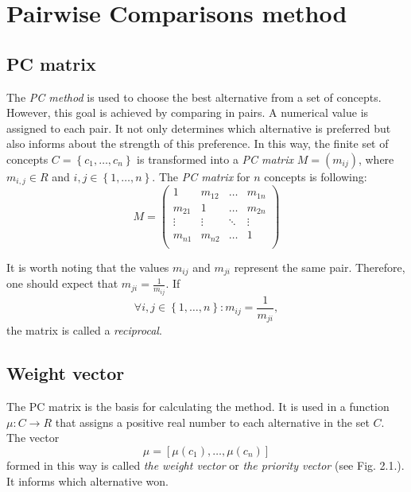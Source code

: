 \chapter{Pairwise Comparisons method}
\label{sec:pcMethod}
  \section{PC matrix}
	\label{subsec:macierzPC}
	
	The \textit{PC method} is used to choose the best alternative from a set of concepts. However, this goal is achieved by comparing in pairs. A numerical value is assigned to each pair. It not only determines which alternative is preferred but also informs about the strength of this preference. In this way, the finite set of concepts $C=\left\{ c_{1},\ldots,c_{n}\right\} $ is transformed into a \textit{PC matrix} $M=\left(m_{ij}\right)$, where $m_{i,j}\in R$ and $i,j\in\left\{ 1,\ldots,n\right\}$. The \textit{PC matrix} for $n$ concepts is following:
$$
M = 
\left(
\begin{array}{lllll}
	1 & m_{12} & \dots & m_{1n}\\
	m_{21} & 1 & \dots & m_{2n}\\
	\vdots & \vdots & \ddots & \vdots\\
	m_{n1} & m_{n2} & \dots & 1\\ 	
\end{array}
\right)
$$

	It is worth noting that the values $m_{ij}$ and $m_{ji}$ represent the same pair. Therefore, one should expect that $m_{ji}=\frac{1}{m_{ij}}$. If
	\begin{equation} 
		\forall i,j\in\left\{ 1,\ldots,n\right\} :m_{ij}=\frac{1}{m_{ji}},
	\end{equation}
		the matrix is called a \textit{reciprocal}.

  \section{Weight vector}
	\label{subsec:wektorWag}
	
	The PC matrix is the basis for calculating the method. It is used in a function $\mu:C\rightarrow R$ that assigns a positive real number to each alternative in the set $C$. The vector $$\mu=\left[\mu\left(c_{1}\right),\ldots,\mu\left(c_{n}\right)\right]$$ formed in this way is called \textit{the weight vector} or \textit{the priority vector} (see Fig. 2.1.). It informs which alternative won.

